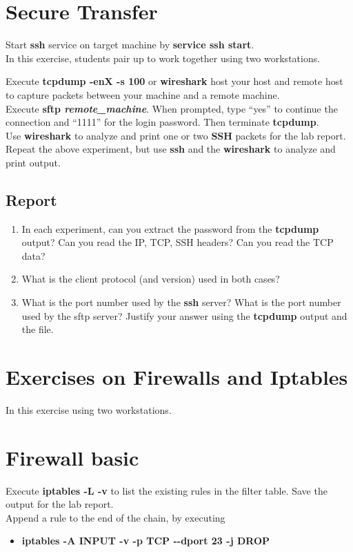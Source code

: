 \documentclass{../UTNetLab}
\begin{document}
\section{Secure Transfer}
	Start \textbf{ssh} service on target machine by \textbf{service ssh start}.\\
		In this exercise, students pair up to work together using two workstations.
	
	Execute \textbf{tcpdump -enX -s 100} or \textbf{wireshark} host your host and remote host to capture packets between your machine and a remote machine.\\
	Execute \textbf{sftp \textit{remote\_machine}}. When prompted, type “yes” to continue the connection and “1111” for the login password. Then terminate \textbf{tcpdump}.\\
	Use \textbf{wireshark} to analyze and print one or two \textbf{SSH} packets for the lab report.\\
	Repeat the above experiment, but use \textbf{ssh} and the \textbf{wireshark} to analyze and print output.\\

	\subsection*{Report}
	\begin{enumerate}
		\item In each experiment, can you extract the password from the \textbf{tcpdump} output? Can you read the IP, TCP, SSH headers? Can you read the TCP data?
		\item What is the client protocol (and version) used in both cases?
		\item What is the port number used by the \textbf{ssh} server? What is the port number used by the sftp server? Justify your answer using the \textbf{tcpdump} output and the  file.
	\end{enumerate}

\section*{Exercises on Firewalls and Iptables}
	In this exercise using two workstations.

\section{Firewall basic}
	Execute \textbf{iptables -L -v} to list the existing rules in the filter table. Save the output for the lab report.\\
	Append a rule to the end of the  chain, by executing
	\begin{itemize}
		\setlength{\itemindent}{10pt}
		\item \textbf{iptables -A INPUT -v -p TCP -{}-dport 23 -j DROP} 
	\end{itemize}
	
\end{document}
